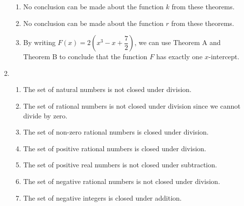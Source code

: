 \begin{enumerate}
\begin{enumerate}
\item No conclusion can be made about the function $k$ from these theorems.

\item No conclusion can be made about the function $r$ from these theorems.

\item By writing $F(x) = 2 \left(x^3 - x + \dfrac{7}{2} \right)$, we can use Theorem A and Theorem B to conclude that the function $F$ has exactly one $x$-intercept.
\end{enumerate}




\item \begin{enumerate} 
\item The set of natural numbers is not closed under division.

\item The set of rational numbers is not closed under division since we cannot divide by zero.

\item The set of non-zero rational numbers is closed under division.

\item The set of positive rational numbers is closed under division.

\item The set of positive real numbers is not closed under subtraction.

\item The set of negative rational numbers is not closed under division.

\item The set of negative integers is closed under addition.
\end{enumerate}
\end{enumerate}



